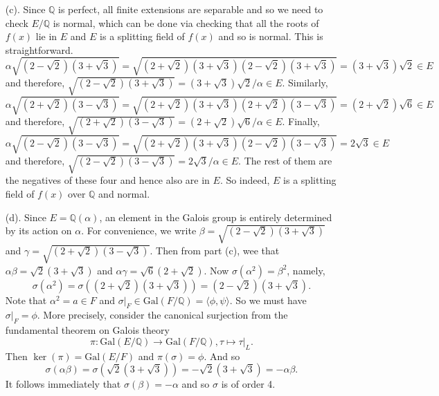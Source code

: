 \documentclass[12pt,reqno]{article}
\theoremstyle{definition}
\newcommand{\gal}{\mbox{Gal}}
\newcommand{\ta}[1]{\langle #1 \rangle}
\newcommand{\qq}{\mathbb{Q}}
\begin{document}
\begin{solution}{1}
\begin{enumerate}
		\item[(c).] Since $\qq$ is perfect, all finite extensions are separable and so we need to check $E/\qq$ is normal, which can be done via checking that all the roots of $f(x)$ lie in $E$ and $E$ is a splitting field of $f(x)$ and so is normal. This is straightforward.
		      \[\alpha\sqrt{(2-\sqrt{2})(3+\sqrt{3})} =\sqrt{(2+\sqrt{2})(3+\sqrt{3})(2-\sqrt{2})(3+\sqrt{3})}=(3+\sqrt{3})\sqrt{2} \in E\]
		      and therefore, $\sqrt{(2-\sqrt{2})(3+\sqrt{3})} =  (3+\sqrt{3})\sqrt{2}/ \alpha\in E$.
		      Similarly, \[\alpha\sqrt{(2+\sqrt{2})(3-\sqrt{3})} =\sqrt{(2+\sqrt{2})(3+\sqrt{3})(2+\sqrt{2})(3-\sqrt{3})}=(2+\sqrt{2})\sqrt{6} \in E\]
		      and therefore, $\sqrt{(2+\sqrt{2})(3-\sqrt{3})} = (2+\sqrt{2})\sqrt{6}/ \alpha\in E$.
		      Finally,  \[\alpha\sqrt{(2-\sqrt{2})(3-\sqrt{3})} =\sqrt{(2+\sqrt{2})(3+\sqrt{3})(2-\sqrt{2})(3-\sqrt{3})}=2\sqrt{3} \in E\]
		      and therefore, $\sqrt{(2-\sqrt{2})(3-\sqrt{3})} = 2\sqrt{3}/ \alpha\in E$. The rest of them are the negatives of these four and hence also are in $E$. So indeed, $E$ is a splitting field of $f(x)$ over $\qq$ and normal.
		\item[(d).] Since $E=\qq(\alpha)$, an element in the Galois group is entirely determined by its action on $\alpha$. For convenience, we write $\beta = \sqrt{(2-\sqrt{2})(3+\sqrt{3})}$ and $\gamma=\sqrt{(2+\sqrt{2})(3-\sqrt{3})}$. Then from part (c), wee that $\alpha\beta=\sqrt{2}(3+\sqrt{3})$ and $\alpha\gamma=\sqrt{6}(2+\sqrt{2})$. Now $\sigma(\alpha^2)=\beta^2$, namely, $$\sigma(\alpha^2)=\sigma((2+\sqrt{2})(3+\sqrt{3}))=(2-\sqrt{2})(3+\sqrt{3}).$$ Note that $\alpha^2=a\in F$ and $\sigma|_F\in \gal(F/\qq)=\ta{\phi,\psi}$. So we must have $\sigma|_F=\phi$. More precisely, consider the canonical surjection from the fundamental theorem on Galois theory
		      $$\pi:\gal(E/\qq)\to \gal(F/\qq), \tau\mapsto\tau|_L.$$
		      Then $\ker(\pi)=\gal(E/F)$ and $\pi(\sigma)=\phi$. And so $$\sigma(\alpha\beta)=\sigma(\sqrt{2}(3+\sqrt{3}))=-\sqrt{2}(3+\sqrt{3})=-\alpha\beta.$$ It follows immediately that $\sigma(\beta)=-\alpha$ and so $\sigma$ is of order 4.

\end{enumerate}
\end{solution}
\end{document}
